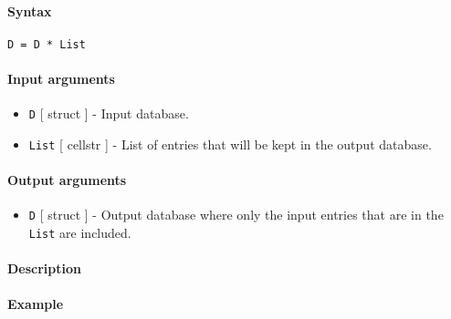 


	\paragraph{Syntax}\label{syntax}

\begin{verbatim}
D = D * List
\end{verbatim}

\paragraph{Input arguments}\label{input-arguments}

\begin{itemize}
\item
  \texttt{D} {[} struct {]} - Input database.
\item
  \texttt{List} {[} cellstr {]} - List of entries that will be kept in
  the output database.
\end{itemize}

\paragraph{Output arguments}\label{output-arguments}

\begin{itemize}
\itemsep1pt\parskip0pt
\item
  \texttt{D} {[} struct {]} - Output database where only the input
  entries that are in the \texttt{List} are included.
\end{itemize}

\paragraph{Description}\label{description}

\paragraph{Example}\label{example}


